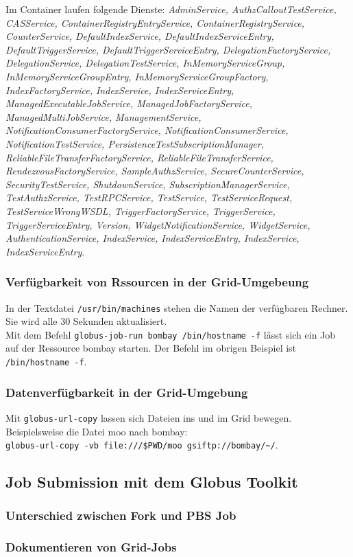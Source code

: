 	Im Container laufen folgende Dienste:
	\textsl{AdminService,
		AuthzCalloutTestService,
		CASService,
		ContainerRegistryEntryService,
		ContainerRegistryService,
		CounterService,
		DefaultIndexService,
		DefaultIndexServiceEntry,
		DefaultTriggerService,
		DefaultTriggerServiceEntry,
		DelegationFactoryService,
		DelegationService,
		DelegationTestService,
		InMemoryServiceGroup,
		InMemoryServiceGroupEntry,
		InMemoryServiceGroupFactory,
		IndexFactoryService,
		IndexService,
		IndexServiceEntry,
		ManagedExecutableJobService,
		ManagedJobFactoryService,
		ManagedMultiJobService,
		ManagementService,
		NotificationConsumerFactoryService,
		NotificationConsumerService,
		NotificationTestService,
		PersistenceTestSubscriptionManager,
		ReliableFileTransferFactoryService,
		ReliableFileTransferService,
		RendezvousFactoryService,
		SampleAuthzService,
		SecureCounterService,
		SecurityTestService,
		ShutdownService,
		SubscriptionManagerService,
		TestAuthzService,
		TestRPCService,
		TestService,
		TestServiceRequest,
		TestServiceWrongWSDL,
		TriggerFactoryService,
		TriggerService,
		TriggerServiceEntry,
		Version,
		WidgetNotificationService,
		WidgetService,
		AuthenticationService,
		IndexService,
		IndexServiceEntry,
		IndexService,
		IndexServiceEntry}.

	\subsubsection{Verfügbarkeit von Rssourcen in der Grid-Umgebeung}
		In der Textdatei \texttt{/usr/bin/machines} stehen die Namen der verfügbaren Rechner.
		Sie wird alle 30 Sekunden aktualisiert.\\
		Mit dem Befehl \texttt{globus-job-run bombay /bin/hostname -f} lässt sich ein Job auf der 
		Ressource \glqq bombay\grqq{} starten. Der Befehl im obrigen Beispiel ist \texttt{/bin/hostname -f}.
		
	\subsubsection{Datenverfügbarkeit in der Grid-Umgebung}
		Mit \texttt{globus-url-copy} lassen sich Dateien ins und im Grid bewegen.
		Beispielsweise die Datei \glqq moo\grqq{} nach \glqq bombay\grqq{}:\\
		 \texttt{globus-url-copy -vb file:///\$PWD/moo gsiftp://bombay/\textasciitilde/}.

\subsection{Job Submission mit dem Globus Toolkit}
	\subsubsection{Unterschied zwischen Fork und PBS Job}
	\subsubsection{Dokumentieren von Grid-Jobs}

